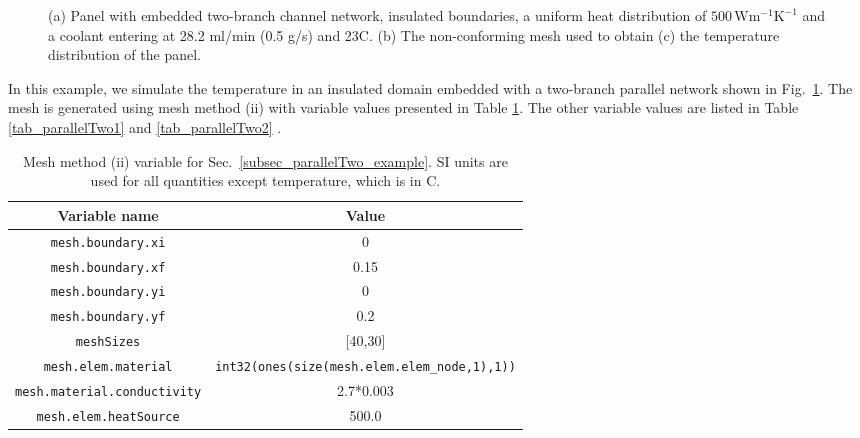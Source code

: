 \documentclass[11pt,letterpaper]{article}
\begin{document}
\begin{figure}[!h]
\begin{subfigure}{0.35\textwidth}
\caption{}
\end{subfigure}
\caption{(a) Panel with embedded two-branch channel network, insulated boundaries, a uniform heat distribution of $500\,\mathrm{Wm^{-1}K^{-1}}$ and a coolant entering at 28.2 ml/min (0.5 g/s) and 23\degree C. (b) The non-conforming mesh used to obtain (c) the temperature distribution of the panel. \label{fig_parallelTwo}}
\end{figure}
In this example, we simulate the temperature in an insulated domain embedded with a two-branch parallel network shown in Fig.\   \ref{fig_parallelTwo}. The mesh is generated using mesh method (ii) with variable values presented in Table \ref{tab_parallelTwo_mesh_method2}. The other variable values are listed in Table \ref{tab_parallelTwo1} and \ref{tab_parallelTwo2} .

\begin{table}[!h]
\caption{Mesh method (ii) variable for Sec.\ \ref{subsec_parallelTwo_example}. SI units are used for all quantities except temperature, which is in \degree C.}
\label{tab_parallelTwo_mesh_method2}
\centering
\begin{tabular}{|c|c|}
\hline
Variable name & Value \\
\hline
\texttt{mesh.boundary.xi} & 0\\
\hline
\texttt{mesh.boundary.xf} & 0.15 \\
\hline
\texttt{mesh.boundary.yi} & 0 \\
\hline
\texttt{mesh.boundary.yf} & 0.2 \\
\hline
\texttt{meshSizes} & [40,30] \\
\hline
\texttt{mesh.elem.material} & \texttt{int32(ones(size(mesh.elem.elem\_node,1),1))} \\
\hline
\texttt{mesh.material.conductivity} & 2.7*0.003 \\
\hline
\texttt{mesh.elem.heatSource} & 500.0 \\
\hline
\end{tabular}
\end{table}
\end{document}
